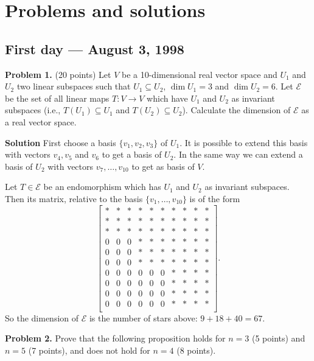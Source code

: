 \documentclass{article}
\begin{document}
\pagestyle{plain}

\section*{Problems and solutions}

\subsection*{First day — August 3, 1998}

\textbf{Problem 1.} (20 points)
Let $V$ be a 10-dimensional real vector space and $U_1$ and $U_2$ two linear subspaces
such that $U_1 \subseteq U_2$, $\dim{U_1} = 3$ and $\dim{U_2} = 6$.
Let $\mathcal{E}$ be the set of all linear maps $T : V \rightarrow V$
which have $U_1$ and $U_2$ as invariant subspaces (i.e., $T(U_1) \subseteq U_1$
and $T(U_2) \subseteq U_2$). Calculate the dimension of $\mathcal{E}$ as a real vector space.

\textbf{Solution} First choose a basis $\{v_1, v_2, v_3\}$ of $U_1$.
It is possible to extend this basis with vectors $v_4,v_5$ and $v_6$
to get a basis of $U_2$. In the same way we can extend a basis
of $U_2$ with vectors $v_7, \ldots, v_{10}$ to get as basis of $V$.

Let $T \in \mathcal{E}$ be an endomorphism
which has $U_1$ and $U_2$ as invariant subspaces.
Then its matrix, relative to the basis $\{v_1, \ldots, v_{10}\}$ is of the form
\[
\begin{bmatrix}
* & * & * & * & * & * & * & * & * & * \\
* & * & * & * & * & * & * & * & * & * \\
* & * & * & * & * & * & * & * & * & * \\
0 & 0 & 0 & * & * & * & * & * & * & * \\
0 & 0 & 0 & * & * & * & * & * & * & * \\
0 & 0 & 0 & * & * & * & * & * & * & * \\
0 & 0 & 0 & 0 & 0 & 0 & * & * & * & * \\
0 & 0 & 0 & 0 & 0 & 0 & * & * & * & * \\
0 & 0 & 0 & 0 & 0 & 0 & * & * & * & * \\
0 & 0 & 0 & 0 & 0 & 0 & * & * & * & * \\
\end{bmatrix}.
\]
So the dimension of $\mathcal{E}$ is the number of stars above: $9+18+40 = 67$.

\textbf{Problem 2.}
Prove that the following proposition holds for \( n = 3 \) (5 points)
and \( n = 5 \) (7 points), and does not hold for \( n = 4 \) (8 points).
\end{document}
